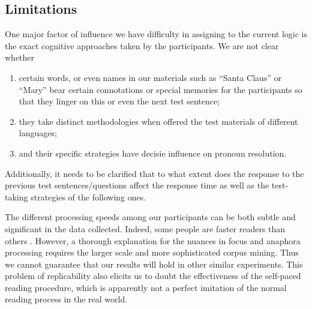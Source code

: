 \subsection{Limitations}
One major factor of influence we have difficulty in assigning to the current logic is the exact cognitive approaches taken by the participants. We are not clear whether 
\begin{enumerate}
    \item certain words, or even names in our materials such as ``Santa Claus'' or ``Mary'' bear certain connotations or special memories for the participants so that they linger on this or even the next test sentence;
    \item they take distinct methodologies when offered the test materials of different languages;
    \item and their specific strategies have decisie influence on pronoun resolution.
\end{enumerate}
 Additionally, it needs to be clarified that to what extent does the response to the previous test sentences/questions affect the response time as well as the test-taking strategies of the following ones.

The different processing speeds among our participants can be both subtle and significant in the data collected. Indeed, some people are faster readers than others \citep{aravind2017}. However, a thorough explanation for the nuances in focus and anaphora processing requires the larger scale and more sophisticated corpus mining. Thus we cannot guarantee that our results will hold in other similar experiments. This problem of replicability \citep{brandt2014} also elicits us to doubt the effectiveness of the self-paced reading procedure, which is apparently not a perfect imitation of the normal reading process in the real world.  